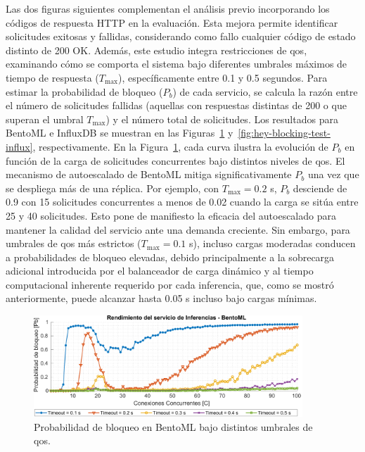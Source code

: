 Las dos figuras siguientes complementan el análisis previo incorporando los códigos de respuesta HTTP en la evaluación. Esta mejora permite identificar solicitudes exitosas y fallidas, considerando como fallo cualquier código de estado distinto de 200 OK. Además, este estudio integra restricciones de \gls{qos}, examinando cómo se comporta el sistema bajo diferentes umbrales máximos de tiempo de respuesta ($T_\text{max}$), específicamente entre 0.1 y 0.5 segundos. Para estimar la probabilidad de bloqueo ($P_b$) de cada servicio, se calcula la razón entre el número de solicitudes fallidas (aquellas con respuestas distintas de 200 o que superan el umbral $T_\text{max}$) y el número total de solicitudes. Los resultados para BentoML e InfluxDB se muestran en las Figuras~\ref{fig:hey-blocking-test-bento} y~\ref{fig:hey-blocking-test-influx}, respectivamente. En la Figura~\ref{fig:hey-blocking-test-bento}, cada curva ilustra la evolución de $P_b$ en función de la carga de solicitudes concurrentes bajo distintos niveles de \gls{qos}. El mecanismo de autoescalado de BentoML mitiga significativamente $P_b$ una vez que se despliega más de una réplica. Por ejemplo, con $T_\text{max} = 0.2$ s, $P_b$ desciende de 0.9 con 15 solicitudes concurrentes a menos de 0.02 cuando la carga se sitúa entre 25 y 40 solicitudes. Esto pone de manifiesto la eficacia del autoescalado para mantener la calidad del servicio ante una demanda creciente. Sin embargo, para umbrales de \gls{qos} más estrictos ($T_\text{max} = 0.1$ s), incluso cargas moderadas conducen a probabilidades de bloqueo elevadas, debido principalmente a la sobrecarga adicional introducida por el balanceador de carga dinámico y al tiempo computacional inherente requerido por cada inferencia, que, como se mostró anteriormente, puede alcanzar hasta 0.05 s incluso bajo cargas mínimas.

\begin{figure}[ht!]
    \centering
    \includegraphics[width=0.9\textwidth]{fig/08_datadriven/datadriven_14.pdf}
    \caption{Probabilidad de bloqueo en BentoML bajo distintos umbrales de \gls{qos}.}
    \label{fig:hey-blocking-test-bento}
\end{figure}

